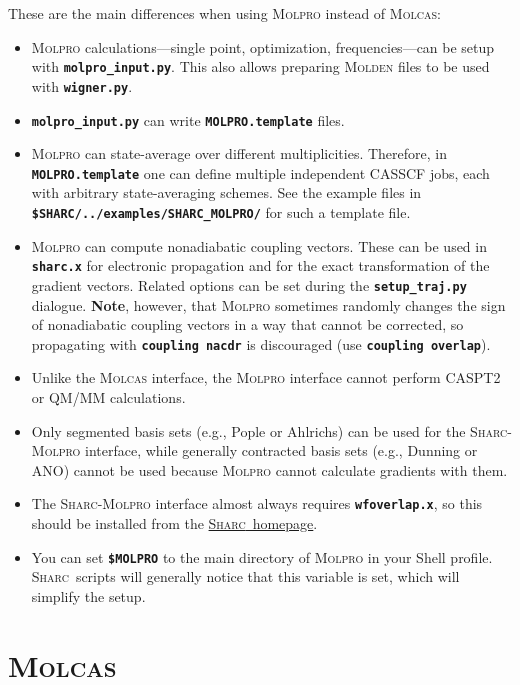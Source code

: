 \documentclass[a4paper,11pt,DIV=15,openany]{scrbook}
\makeatletter
\newcommand{\link}[2]{\href{#1}{#2}}
\newcommand{\refermanual}[2][rectangle,draw=B,thick,fill=black!5,inner sep=1pt,outer sep=0pt,rounded corners]{\marginpar{\tikz[baseline=(current bounding box.north)]\node at (0,0) [#1]{\begin{tabular}{@{}l@{}}See\\ section\\ \ref*{#2}\\ (p. \pageref*{#2})\\ in the\\ manual.\end{tabular}};}}
\newcommand{\sharc}{\textsc{Sharc}}
\newcommand{\ttt}[1]{\textbf{\texttt{#1}}}
\makeatother
\begin{document}
These are the main differences when using \textsc{Molpro} instead of \textsc{Molcas}:
\begin{itemize}
  \item \textsc{Molpro} calculations---single point, optimization, frequencies---can be setup with \ttt{molpro\_input.py}. This also allows preparing \textsc{Molden} files to be used with \ttt{wigner.py}.
  \item \ttt{molpro\_input.py} can write \ttt{MOLPRO.template} files. 
  \item \textsc{Molpro} can state-average over different multiplicities. Therefore, in \ttt{MOLPRO.template} one can define multiple independent CASSCF jobs, each with arbitrary state-averaging schemes. See the example files in \ttt{\$SHARC/../examples/SHARC\_MOLPRO/} for such a template file.
  \item \textsc{Molpro} can compute nonadiabatic coupling vectors. These can be used in \ttt{sharc.x} for electronic propagation and for the exact transformation of the gradient vectors. Related options can be set during the \ttt{setup\_traj.py} dialogue. \textbf{Note}, however, that \textsc{Molpro} sometimes randomly changes the sign of nonadiabatic coupling vectors in a way that cannot be corrected, so propagating with \ttt{coupling nacdr} is discouraged (use \ttt{coupling overlap}).
  \item Unlike the \textsc{Molcas} interface, the \textsc{Molpro} interface cannot perform CASPT2 or QM/MM calculations.
  \item Only segmented basis sets (e.g., Pople or Ahlrichs) can be used for the \sharc-\textsc{Molpro} interface, while generally contracted basis sets (e.g., Dunning or ANO) cannot be used because \textsc{Molpro} cannot calculate gradients with them.
  \item The \sharc-\textsc{Molpro} interface almost always requires \ttt{wfoverlap.x}, so this should be installed from the \link{https://sharc-md.org/?page_id=309}{\sharc\ homepage}.
  \item You can set \ttt{\$MOLPRO} to the main directory of \textsc{Molpro} in your Shell profile. \sharc\ scripts will generally notice that this variable is set, which will simplify the setup.
\end{itemize}


\section{\textsc{Molcas}}
\refermanual{m-sec:int:molcas}
\end{document}
